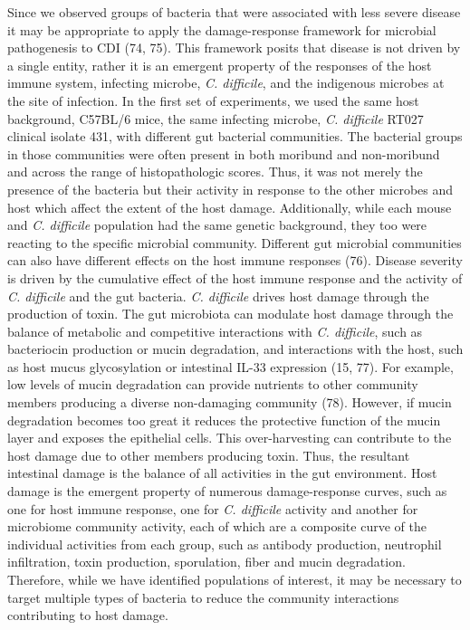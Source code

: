 \documentclass[
  12pt,
]{article}
\begin{document}
Since we observed groups of bacteria that were associated with less
severe disease it may be appropriate to apply the damage-response
framework for microbial pathogenesis to CDI (74, 75). This framework
posits that disease is not driven by a single entity, rather it is an
emergent property of the responses of the host immune system, infecting
microbe, \emph{C. difficile}, and the indigenous microbes at the site of
infection. In the first set of experiments, we used the same host
background, C57BL/6 mice, the same infecting microbe, \emph{C.
difficile} RT027 clinical isolate 431, with different gut bacterial
communities. The bacterial groups in those communities were often
present in both moribund and non-moribund and across the range of
histopathologic scores. Thus, it was not merely the presence of the
bacteria but their activity in response to the other microbes and host
which affect the extent of the host damage. Additionally, while each
mouse and \emph{C. difficile} population had the same genetic
background, they too were reacting to the specific microbial community.
Different gut microbial communities can also have different effects on
the host immune responses (76). Disease severity is driven by the
cumulative effect of the host immune response and the activity of
\emph{C. difficile} and the gut bacteria. \emph{C. difficile} drives
host damage through the production of toxin. The gut microbiota can
modulate host damage through the balance of metabolic and competitive
interactions with \emph{C. difficile}, such as bacteriocin production or
mucin degradation, and interactions with the host, such as host mucus
glycosylation or intestinal IL-33 expression (15, 77). For example, low
levels of mucin degradation can provide nutrients to other community
members producing a diverse non-damaging community (78). However, if
mucin degradation becomes too great it reduces the protective function
of the mucin layer and exposes the epithelial cells. This
over-harvesting can contribute to the host damage due to other members
producing toxin. Thus, the resultant intestinal damage is the balance of
all activities in the gut environment. Host damage is the emergent
property of numerous damage-response curves, such as one for host immune
response, one for \emph{C. difficile} activity and another for
microbiome community activity, each of which are a composite curve of
the individual activities from each group, such as antibody production,
neutrophil infiltration, toxin production, sporulation, fiber and mucin
degradation. Therefore, while we have identified populations of
interest, it may be necessary to target multiple types of bacteria to
reduce the community interactions contributing to host damage.
\end{document}
